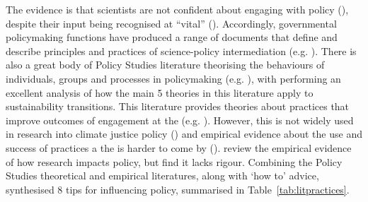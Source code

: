The evidence is that scientists are not confident about engaging with policy (\cite{KEU2021perceptions}), despite their input being recognised at ``vital'' (\cite{KennyRHTB2017}). Accordingly, governmental policymaking functions have produced a range of documents that define and describe principles and practices of science-policy intermediation (e.g. \cite{OECD2015,DottiACDMPSVW2024,KarkkainenLKK2024}). There is also a great body of Policy Studies literature theorising the behaviours of individuals, groups and processes in policymaking (e.g. \cite{Kingdon1993,Hajer2005,Dowding2018}), with \textcite{KernR2018} performing an excellent analysis of how the main 5 theories in this literature apply to sustainability transitions. This literature provides theories about practices that improve outcomes of engagement at the \SPI{} (e.g. \cite{RykielEtAl2002,McNie2007,Gluckman2014,BlessenohlS2022}). However, this is not widely used in research into climate justice policy (\cite{CairneyTS2023}) and empirical evidence about the use and success of practices a the \SPI{} is harder to come by (\cite{JagannathanEtAl2023}). \textcite{OliverHBGC2022} review the empirical evidence of how research impacts policy, but find it lacks rigour. Combining the Policy Studies theoretical and empirical literatures, along with `how to' advice, \textcite{OliverC2019} synthesised 8 tips for influencing policy, summarised in Table~\ref{tab:litpractices}.


